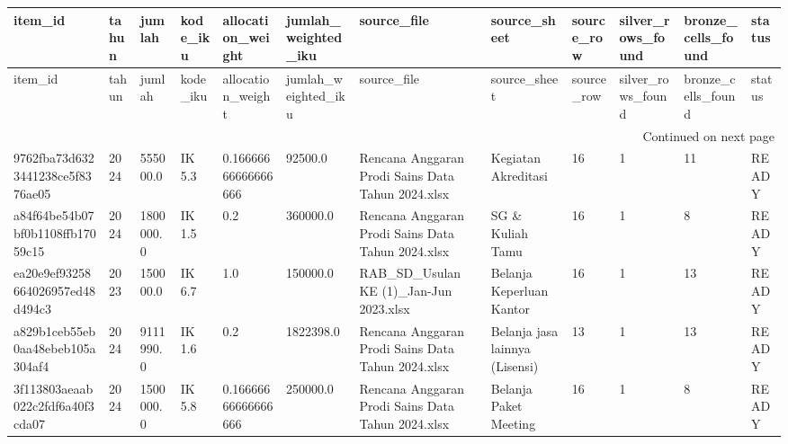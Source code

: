 \begingroup
\scriptsize
\begin{longtable}{llllllllllll}
\toprule
item_id & tahun & jumlah & kode_iku & allocation_weight & jumlah_weighted_iku & source_file & source_sheet & source_row & silver_rows_found & bronze_cells_found & status \\
\midrule
\endfirsthead
\toprule
item_id & tahun & jumlah & kode_iku & allocation_weight & jumlah_weighted_iku & source_file & source_sheet & source_row & silver_rows_found & bronze_cells_found & status \\
\midrule
\endhead
\midrule
\multicolumn{12}{r}{Continued on next page} \\
\midrule
\endfoot
\bottomrule
\endlastfoot
9762fba73d6323441238ce5f8376ae05 & 2024 & 555000.0 & IK 5.3 & 0.16666666666666666 & 92500.0 & Rencana Anggaran Prodi Sains Data Tahun 2024.xlsx & Kegiatan Akreditasi & 16 & 1 & 11 & READY \\
a84f64be54b07bf0b1108ffb17059c15 & 2024 & 1800000.0 & IK 1.5 & 0.2 & 360000.0 & Rencana Anggaran Prodi Sains Data Tahun 2024.xlsx & SG \& Kuliah Tamu & 16 & 1 & 8 & READY \\
ea20e9ef93258664026957ed48d494c3 & 2023 & 150000.0 & IK 6.7 & 1.0 & 150000.0 & RAB\_SD\_Usulan KE (1)\_Jan-Jun 2023.xlsx & Belanja Keperluan Kantor & 16 & 1 & 13 & READY \\
a829b1ceb55eb0aa48ebeb105a304af4 & 2024 & 9111990.0 & IK 1.6 & 0.2 & 1822398.0 & Rencana Anggaran Prodi Sains Data Tahun 2024.xlsx & Belanja jasa lainnya (Lisensi) & 13 & 1 & 13 & READY \\
3f113803aeaab022c2fdf6a40f3cda07 & 2024 & 1500000.0 & IK 5.8 & 0.16666666666666666 & 250000.0 & Rencana Anggaran Prodi Sains Data Tahun 2024.xlsx & Belanja Paket Meeting & 16 & 1 & 8 & READY \\
\end{longtable}
\endgroup
